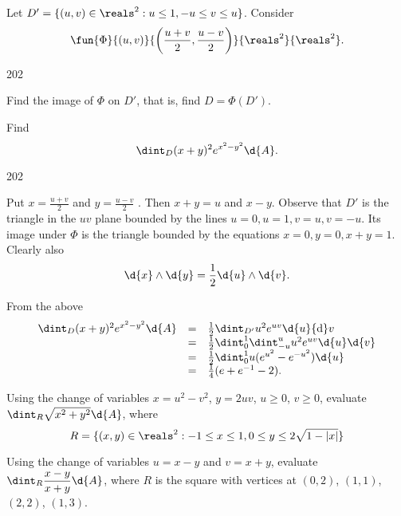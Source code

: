   
\section*{}
\begin{pro}
Let $D' = \{(u, v)\in\reals^2: u  \leq 1, -u \leq v \leq u\}$.
Consider $$\fun{\Phi}{(u, v)}{\left(\frac{u + v}{2}, \frac{u -
v}{2}\right)}{\reals^2}{\reals^2}.$$
\begin{dingautolist}{202}
\item Find the image of $\Phi$ on $D'$, that is, find $D = \Phi
(D')$. \item Find $$\dint_D (x + y)^2e^{x^2 - y^2}\d{A}.$$
\end{dingautolist} \begin{answer}
\begin{dingautolist}{202}
\item  Put $x = \frac{u + v}{2}$ and $y = \frac{u - v}{2}$ . Then
$x + y = u$ and  $x - y$. Observe that $D'$ is the triangle in the
$uv$ plane bounded by the lines $u = 0, u = 1, v = u, v = -u.$ Its
image under $\Phi$ is the triangle bounded by the equations $x = 0,
y = 0, x + y = 1.$ Clearly also
$$\d{x}\wedge \d{y} = \frac{1}{2}\d{u}\wedge\d{v}.$$

\item  From the above
$$\begin{array}{lll}\dint_D (x + y)^2e^{x^2 - y^2}\d{A}
& = & \frac{1}{2}\dint_{D'} u^2e^{uv}\d{u}{\rm d}v \\
& = & \frac{1}{2}\dint _0 ^1 \dint _{-u} ^u u^2 e^{uv} \d{u}\d{v} \\
& = & \frac{1}{2}\dint _0 ^1 u(e^{u^2} - e^{-u^2})\d{u}\\
& = & \frac{1}{4}(e + e^{-1} - 2).
\end{array}$$
\end{dingautolist}
\end{answer}
\end{pro}
\begin{pro}
Using the change of variables $x=u^2-v^2$, $y=2uv$, $u \geq 0$,
$v\geq 0$, evaluate $\dint _R \sqrt{x^2+y^2}\d{A}$, where
$$R=\{(x,y)\in\reals^2: -1\leq x \leq 1, 0 \leq y \leq 2\sqrt{1-|x|}\}$$
\end{pro}
\begin{pro}Using  the change of variables $u = x-y$ and $v = x + y$,
evaluate $\dint _R \dfrac{x-y}{x+y}\d{A}$, where
 $R$ is the square with vertices at  $(0, 2)$, $(1, 1)$, $ (2, 2)$,
$(1, 3)$.
\end{pro}
